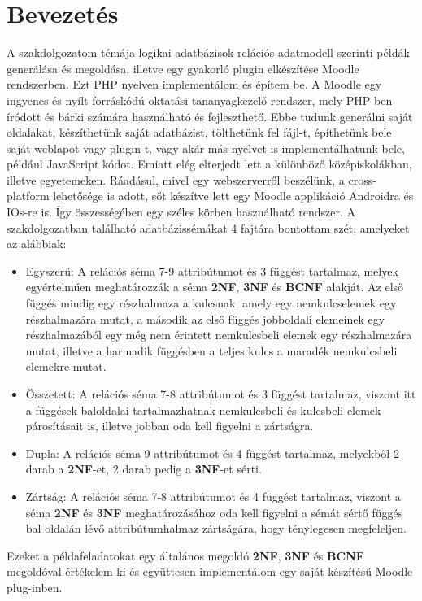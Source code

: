 \chapter*{Bevezetés}
A szakdolgozatom témája logikai adatbázisok relációs adatmodell szerinti példák generálása és megoldása, illetve egy gyakorló plugin elkészítése Moodle rendszerben. Ezt PHP nyelven implementálom és építem be. A Moodle egy ingyenes és nyílt forráskódú oktatási tananyagkezelő rendszer, mely PHP-ben íródott és bárki számára használható és fejleszthető. Ebbe tudunk generálni saját oldalakat, készíthetünk saját adatbázist, tölthetünk fel fájl-t, építhetünk bele saját weblapot vagy plugin-t, vagy akár más nyelvet is implementálhatunk bele, például JavaScript kódot. Emiatt elég elterjedt lett a különböző középiskolákban, illetve egyetemeken. Ráadásul, mivel egy webszerverről beszélünk, a cross-platform lehetősége is adott, sőt készítve lett egy Moodle applikáció Androidra és IOs-re is. Így összességében egy széles körben használható rendszer. \hfill \newline
A szakdolgozatban található adatbázissémákat 4 fajtára bontottam szét, amelyeket az alábbiak:\hfill \newline
\begin{itemize}
    \item Egyszerű: A relációs séma 7-9 attribútumot és 3 függést tartalmaz, melyek egyértelműen meghatározzák a séma \textbf{2NF}, \textbf{3NF} és \textbf{BCNF} alakját. Az első függés mindig egy részhalmaza a kulcsnak, amely egy nemkulcselemek egy részhalmazára mutat, a második az első függés jobboldali elemeinek egy részhalmazából egy még nem érintett nemkulcsbeli elemek egy részhalmazára mutat, illetve a harmadik függésben a teljes kulcs a maradék nemkulcsbeli elemekre mutat.
    \item Összetett: A relációs séma 7-8 attribútumot és 3 függést tartalmaz, viszont itt a függések baloldalai tartalmazhatnak nemkulcsbeli és kulcsbeli elemek párosításait is, illetve jobban oda kell figyelni a zártságra.
    \item Dupla: A relációs séma 9 attribútumot és 4 függést tartalmaz, melyekből 2 darab a \textbf{2NF}-et, 2 darab pedig a \textbf{3NF}-et sérti.
    \item Zártság: A relációs séma 7-8 attribútumot és 4 függést tartalmaz, viszont a séma \textbf{2NF} és \textbf{3NF} meghatározásához oda kell figyelni a sémát sértő függés bal oldalán lévő attribútumhalmaz zártságára, hogy ténylegesen megfeleljen.
\end{itemize}
Ezeket a példafeladatokat egy általános megoldó \textbf{2NF}, \textbf{3NF} és \textbf{BCNF} megoldóval értékelem ki és együttesen implementálom egy saját készítésű Moodle plug-inben.\hfill \newline

